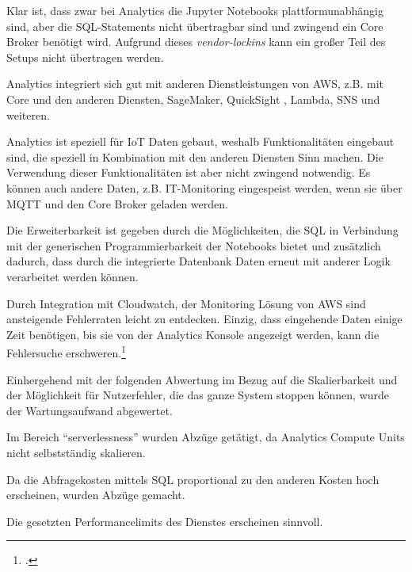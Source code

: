 Klar ist, dass zwar bei \AWSIOT{} Analytics die Jupyter Notebooks plattformunabhängig sind, aber die \ac{SQL}-Statements nicht übertragbar sind und zwingend ein \AWSIOT{} Core Broker benötigt wird. Aufgrund dieses \textit{vendor-lockins} kann ein großer Teil des Setups nicht übertragen werden.

\AWSIOT{} Analytics integriert sich gut mit anderen Dienstleistungen von AWS, z.B. mit \AWSIOT{} Core und den anderen \AWSIOT{} Diensten, SageMaker, QuickSight , Lambda, \ac{SNS} und weiteren.

\AWSIOT{} Analytics ist speziell für \ac{IoT} Daten gebaut, weshalb Funktionalitäten eingebaut sind, die speziell in Kombination mit den anderen \AWSIOT{} Diensten Sinn machen. Die Verwendung dieser Funktionalitäten ist aber nicht zwingend notwendig. Es können auch andere Daten, z.B. IT-Monitoring eingespeist werden, wenn sie über \ac{MQTT} und den \AWSIOT{} Core Broker geladen werden.

Die Erweiterbarkeit ist gegeben durch die Möglichkeiten, die \ac{SQL} in Verbindung mit der generischen Programmierbarkeit der Notebooks bietet und zusätzlich dadurch, dass durch die integrierte Datenbank Daten erneut mit anderer Logik verarbeitet werden können.

Durch Integration mit Cloudwatch, der Monitoring Lösung von \ac{AWS} sind ansteigende Fehlerraten leicht zu entdecken. Einzig, dass eingehende Daten einige Zeit benötigen, bis sie von der \AWSIOT{} Analytics Konsole angezeigt werden, kann die Fehlersuche erschweren.\footcite[Vgl.][]{AmazonWebServicesInc..o.J.aw}

Einhergehend mit der folgenden Abwertung im Bezug auf die Skalierbarkeit und der Möglichkeit für Nutzerfehler, die das ganze System stoppen können, wurde der Wartungsaufwand abgewertet.

Im Bereich \enquote{serverlessness} wurden Abzüge getätigt, da Analytics Compute Units nicht selbstständig skalieren.

Da die Abfragekosten mittels \ac{SQL} proportional zu den anderen Kosten hoch erscheinen, wurden Abzüge gemacht.

Die gesetzten Performancelimits des Dienstes erscheinen sinnvoll.

